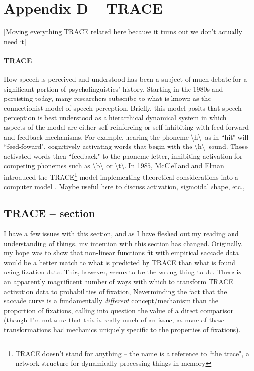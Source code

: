 \section*{Appendix D -- TRACE}

[Moving everything TRACE related here because it turns out we don't actually need it]



\paragraph{TRACE } How speech is perceived and understood has been a subject of much debate for a significant portion of psycholinguistics' history. Starting in the 1980s and persisting today, many researchers subscribe to what is known as the connectionist model of speech perception. Briefly, this model posits that speech perception is best understood as a hierarchical dynamical system in which aspects of the model are either self reinforcing or self inhibiting with feed-forward and feedback mechanisms. For example, hearing the phoneme \textbackslash h\textbackslash  \ as in ``hit" will ``feed-foward", cognitively activating words that begin with the \textbackslash h\textbackslash \  sound. These activated words then ``feedback" to the phoneme letter, inhibiting activation for competing phonemes such as \textbackslash b\textbackslash \ or \textbackslash t\textbackslash. In 1986, McClelland and Elman introduced the TRACE\footnote{TRACE doesn't stand for anything -- the name is a reference to ``the trace", a network structure for dynamically processing things in memory} model implementing theoretical considerations into a computer model \cite{elman1985speech}. Maybe useful here to discuss activation, sigmoidal shape, etc., 


\subsection{TRACE -- section}

I have a few issues with this section, and as I have fleshed out my reading and understanding of things, my intention with this section has changed. Originally, my hope was to show that non-linear functions fit with empirical saccade data would be a better match to what is predicted by TRACE than what is found using fixation data. This, however, seems to be the wrong thing to do. There is an apparently magnificent number of ways with which to transform TRACE activation data to probabilities of fixation, Neverminding the fact that the saccade curve is a fundamentally \textit{different} concept/mechanism than the proportion of fixations, calling into question the value of a direct comparison (though I'm not sure that this is really much of an issue, as none of these transformations had mechanics uniquely specific to the properties of fixations).


